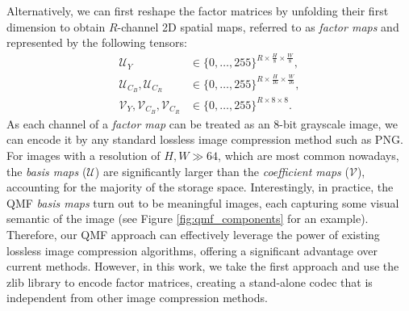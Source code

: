 Alternatively, we can first reshape the factor matrices by unfolding their first dimension to obtain $R$-channel 2D spatial maps, referred to as \emph{factor maps} and represented by the following tensors:
\begin{align} \label{eq:reshaped_factors}
    \bm{\mathcal{U}}_{Y}                                                 & \in \{0, \ldots, 255\}^{R \times \frac{H}{8} \times \frac{W}{8}}, \nonumber \\
    \bm{\mathcal{U}}_{C_B}, \bm{\mathcal{U}}_{C_R}                       & \in \{0, \ldots, 255\}^{R \times \frac{H}{16} \times \frac{W}{16}},         \\
    \bm{\mathcal{V}}_{Y}, \bm{\mathcal{V}}_{C_B}, \bm{\mathcal{V}}_{C_R} & \in \{0, \ldots, 255\}^{R \times 8 \times 8}. \nonumber
\end{align}
As each channel of a \emph{factor map} can be treated as an 8-bit grayscale image, we can encode it by any standard lossless image compression method such as PNG. For images with a resolution of $H, W \gg 64$, which are most common nowadays, the \emph{basis maps} ($\bm{\mathcal{U}}$) are significantly larger than the \emph{coefficient maps} ($\bm{\mathcal{V}}$), accounting for the majority of the storage space. Interestingly, in practice, the QMF \emph{basis maps} turn out to be meaningful images, each capturing some visual semantic of the image (see Figure \ref{fig:qmf_components} for an example). Therefore, our QMF approach can effectively leverage the power of existing lossless image compression algorithms, offering a significant advantage over current methods. However, in this work, we take the first approach and use the zlib library \cite{deutsch1996zlib} to encode factor matrices, creating a stand-alone codec that is independent from other image compression methods.

